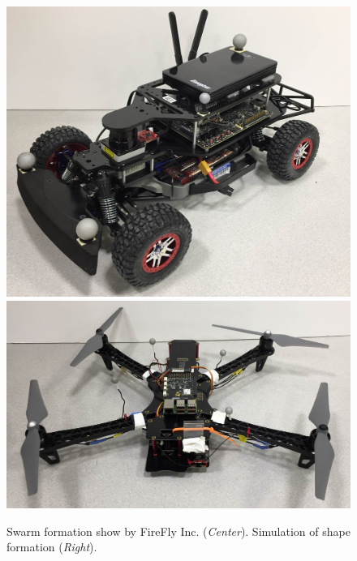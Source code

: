 \begin{figure}[h!]
\begin{minipage}{0.55\columnwidth}
	\includegraphics[width=0.42\linewidth]{figs/car.jpg}
	\includegraphics[width=0.56\linewidth]{figs/quad.jpg}
\end{minipage}%
	\caption{Swarm formation show by FireFly Inc. (\emph{Center}). Simulation of shape formation (\emph{Right}).}
    \label{firefly}
	\vspace{-5mm}
\end{figure}



